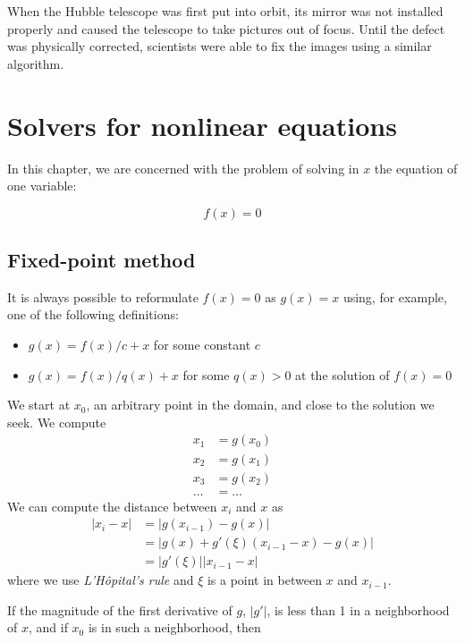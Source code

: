 \documentclass[justified,sixbynine]{tufte-book}
\theoremstyle{plain}%
\theoremstyle{definition}
\theoremstyle{remark}
\begin{document}
\begin{fullwidth}
When the Hubble telescope was first put into orbit, its mirror was not installed properly and caused the telescope to take pictures out of focus. Until the defect was physically corrected, scientists were able to fix the images using a similar algorithm.

\goodbreak\section{Solvers for nonlinear equations}


In this chapter, we are concerned with the problem of solving in $x$ the equation of one variable:

\begin{equation}
f(x) = 0
\end{equation}

\goodbreak\subsection{Fixed-point method}


It is always possible to reformulate $f(x)=0$ as $g(x)=x$ using, for example, one of the following definitions:
\begin{itemize}
\item $g(x) = f(x)/c+x$ for some constant $c$
\item $g(x) = f(x)/q(x)+x$ for some $q(x)>0$ at the solution of $f(x)=0$
\end{itemize}

We start at $x_0$, an arbitrary point in the domain, and close to the solution we seek. We compute
\begin{align}
x_1 &= g(x_0) \\
x_2 &= g(x_1) \\
x_3 &= g(x_2) \\
\dots &=\dots 
\end{align}
We can compute the distance between $x_i$ and $x$ as
\begin{align}
|x_i - x| &= |g(x_{i-1})-g(x)| \\
          &= |g(x)+g'(\xi)(x_{i-1}-x)-g(x)| \\
          &= |g'(\xi)||x_{i-1}-x|
\end{align}
where we use {\it L'H\^{o}pital's rule} and $\xi$ is a point in between $x$ and $x_{i-1}$.

If the magnitude of the first derivative of $g$, $|g'|$, is less than 1 in a neighborhood of $x$, and if $x_0$ is in such a neighborhood, then


\end{fullwidth}
\end{document}
